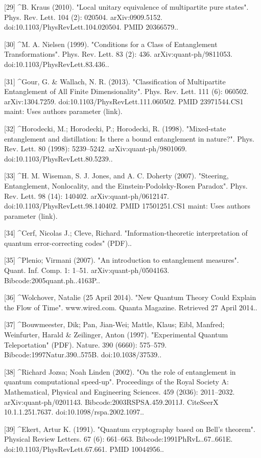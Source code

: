 [29]
^B. Kraus (2010). "Local unitary equivalence of multipartite pure states". Phys. Rev. Lett. 104 (2): 020504. arXiv:0909.5152. doi:10.1103/PhysRevLett.104.020504. PMID 20366579..

[30]
^M. A. Nielsen (1999). "Conditions for a Class of Entanglement Transformations". Phys. Rev. Lett. 83 
(2): 436. arXiv:quant-ph/9811053. doi:10.1103/PhysRevLett.83.436..

[31]
^Gour, G. & Wallach, N. R. (2013). "Classification of Multipartite Entanglement of All Finite Dimensionality". Phys. Rev. Lett. 111 (6): 060502. arXiv:1304.7259. doi:10.1103/PhysRevLett.111.060502. PMID 23971544.CS1 maint: Uses authors parameter (link).

[32]
^Horodecki, M.; Horodecki, P.; Horodecki, R. (1998). "Mixed-state entanglement and distillation: Is there a bound entanglement in nature?". Phys. Rev. Lett. 80 (1998): 5239–5242. arXiv:quant-ph/9801069. doi:10.1103/PhysRevLett.80.5239..

[33]
^H. M. Wiseman, S. J. Jones, and A. C. Doherty (2007). "Steering, Entanglement, Nonlocality, and the Einstein-Podolsky-Rosen Paradox". Phys. Rev. Lett. 98 (14): 140402. arXiv:quant-ph/0612147. doi:10.1103/PhysRevLett.98.140402. PMID 17501251.CS1 maint: Uses authors parameter (link).

[34]
^Cerf, Nicolas J.; Cleve, Richard. "Information-theoretic interpretation of quantum error-correcting codes" (PDF)..

[35]
^Plenio; Virmani (2007). "An introduction to entanglement measures". Quant. Inf. Comp. 1: 1–51. arXiv:quant-ph/0504163. Bibcode:2005quant.ph..4163P..

[36]
^Wolchover, Natalie (25 April 2014). "New Quantum Theory Could Explain the Flow of Time". www.wired.com. Quanta Magazine. Retrieved 27 April 2014..

[37]
^Bouwmeester, Dik; Pan, Jian-Wei; Mattle, Klaus; Eibl, Manfred; Weinfurter, Harald & Zeilinger, Anton (1997). "Experimental Quantum Teleportation" (PDF). Nature. 390 (6660): 575–579. Bibcode:1997Natur.390..575B. doi:10.1038/37539..

[38]
^Richard Jozsa; Noah Linden (2002). "On the role of entanglement in quantum computational speed-up". Proceedings of the Royal Society A: Mathematical, Physical and Engineering Sciences. 459 (2036): 2011–2032. arXiv:quant-ph/0201143. Bibcode:2003RSPSA.459.2011J. CiteSeerX 10.1.1.251.7637. doi:10.1098/rspa.2002.1097..

[39]
^Ekert, Artur K. (1991). "Quantum cryptography based on Bell's theorem". Physical Review Letters. 67 (6): 661–663. Bibcode:1991PhRvL..67..661E. doi:10.1103/PhysRevLett.67.661. PMID 10044956..

